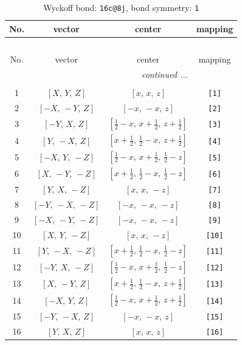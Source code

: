 \documentclass[fleqn,8pt]{jsarticle}
\begin{document}
\begin{longtable}{cccc}
\caption{Wyckoff bond: {\tt 16c@8j}, bond symmetry: {\tt 1}}
 \\
 \hline \hline
No. & vector & center & mapping \\ \hline \endfirsthead

\multicolumn{3}{l}{\tablename\ \thetable{}} \\
 \hline \hline
No. & vector & center & mapping \\ \hline \endhead

 \hline \hline
\multicolumn{3}{r}{\footnotesize\it continued ...} \\ \endfoot

 \hline \hline
\multicolumn{3}{r}{} \\ \endlastfoot

1 & $\left[ X,\, Y,\, Z \right]$ & $\left[ x,\, x,\, z \right]$ & {\tt [1]} \\ \hline
2 & $\left[ - X,\, - Y,\, Z \right]$ & $\left[ - x,\, - x,\, z \right]$ & {\tt [2]} \\ \hline
3 & $\left[ - Y,\, X,\, Z \right]$ & $\left[ \frac{1}{2} - x,\, x + \frac{1}{2},\, z + \frac{1}{2} \right]$ & {\tt [3]} \\ \hline
4 & $\left[ Y,\, - X,\, Z \right]$ & $\left[ x + \frac{1}{2},\, \frac{1}{2} - x,\, z + \frac{1}{2} \right]$ & {\tt [4]} \\ \hline
5 & $\left[ - X,\, Y,\, - Z \right]$ & $\left[ \frac{1}{2} - x,\, x + \frac{1}{2},\, \frac{1}{2} - z \right]$ & {\tt [5]} \\ \hline
6 & $\left[ X,\, - Y,\, - Z \right]$ & $\left[ x + \frac{1}{2},\, \frac{1}{2} - x,\, \frac{1}{2} - z \right]$ & {\tt [6]} \\ \hline
7 & $\left[ Y,\, X,\, - Z \right]$ & $\left[ x,\, x,\, - z \right]$ & {\tt [7]} \\ \hline
8 & $\left[ - Y,\, - X,\, - Z \right]$ & $\left[ - x,\, - x,\, - z \right]$ & {\tt [8]} \\ \hline
9 & $\left[ - X,\, - Y,\, - Z \right]$ & $\left[ - x,\, - x,\, - z \right]$ & {\tt [9]} \\ \hline
10 & $\left[ X,\, Y,\, - Z \right]$ & $\left[ x,\, x,\, - z \right]$ & {\tt [10]} \\ \hline
11 & $\left[ Y,\, - X,\, - Z \right]$ & $\left[ x + \frac{1}{2},\, \frac{1}{2} - x,\, \frac{1}{2} - z \right]$ & {\tt [11]} \\ \hline
12 & $\left[ - Y,\, X,\, - Z \right]$ & $\left[ \frac{1}{2} - x,\, x + \frac{1}{2},\, \frac{1}{2} - z \right]$ & {\tt [12]} \\ \hline
13 & $\left[ X,\, - Y,\, Z \right]$ & $\left[ x + \frac{1}{2},\, \frac{1}{2} - x,\, z + \frac{1}{2} \right]$ & {\tt [13]} \\ \hline
14 & $\left[ - X,\, Y,\, Z \right]$ & $\left[ \frac{1}{2} - x,\, x + \frac{1}{2},\, z + \frac{1}{2} \right]$ & {\tt [14]} \\ \hline
15 & $\left[ - Y,\, - X,\, Z \right]$ & $\left[ - x,\, - x,\, z \right]$ & {\tt [15]} \\ \hline
16 & $\left[ Y,\, X,\, Z \right]$ & $\left[ x,\, x,\, z \right]$ & {\tt [16]} \\
\end{longtable}
\end{document}
